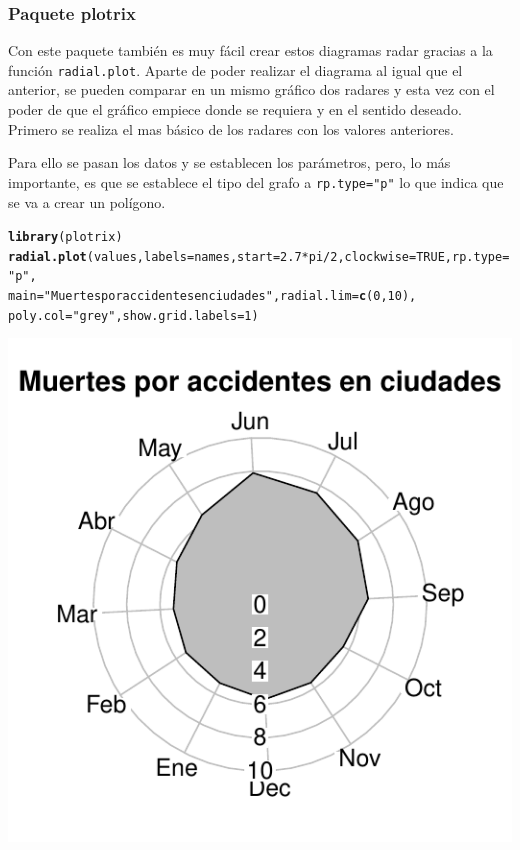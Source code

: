 \documentclass{article}\usepackage[]{graphicx}\usepackage[]{color}
\makeatletter
\def\maxwidth{ %
  \ifdim\Gin@nat@width>\linewidth
    \linewidth
  \else
    \Gin@nat@width
  \fi
}
\newcommand{\hlnum}[1]{\textcolor[rgb]{0.686,0.059,0.569}{#1}}%
\newcommand{\hlstr}[1]{\textcolor[rgb]{0.192,0.494,0.8}{#1}}%
\newcommand{\hlopt}[1]{\textcolor[rgb]{0,0,0}{#1}}%
\newcommand{\hlstd}[1]{\textcolor[rgb]{0.345,0.345,0.345}{#1}}%
\newcommand{\hlkwc}[1]{\textcolor[rgb]{0.333,0.667,0.333}{#1}}%
\newcommand{\hlkwd}[1]{\textcolor[rgb]{0.737,0.353,0.396}{\textbf{#1}}}%
\newenvironment{kframe}{%
 \def\at@end@of@kframe{}%
 \ifinner\ifhmode%
  \def\at@end@of@kframe{\end{minipage}}%
  \begin{minipage}{\columnwidth}%
 \fi\fi%
 \def\FrameCommand##1{\hskip\@totalleftmargin \hskip-\fboxsep
 \colorbox{shadecolor}{##1}\hskip-\fboxsep
     \hskip-\linewidth \hskip-\@totalleftmargin \hskip\columnwidth}%
 \MakeFramed {\advance\hsize-\width
   \@totalleftmargin\z@ \linewidth\hsize
   \@setminipage}}%
 {\par\unskip\endMakeFramed%
 \at@end@of@kframe}
\newenvironment{knitrout}{}{} %
\makeatother
\begin{document}
\subsubsection{Paquete plotrix}
Con este paquete\cite{docu_plotrix} tambi\'en es muy f\'acil crear estos diagramas radar gracias a la funci\'on \texttt{radial.plot}. Aparte de poder realizar el diagrama al igual que el anterior, se pueden comparar en un mismo gr\'afico dos radares y esta vez con el poder de que el gr\'afico empiece donde se requiera y en el sentido deseado.~\\
Primero se realiza el mas b\'asico de los radares con los valores anteriores.


Para ello se pasan los datos y se establecen los par\'ametros, pero, lo m\'as importante, es que se establece el tipo del grafo a \texttt{rp.type="p"} lo que indica que se va a crear un pol\'igono.
\begin{knitrout}
\color{fgcolor}\begin{kframe}
\begin{alltt}
\hlkwd{library}\hlstd{(plotrix)}
\hlkwd{radial.plot}\hlstd{(values,}\hlkwc{labels}\hlstd{=names,} \hlkwc{start} \hlstd{=} \hlnum{2.7}\hlopt{*}\hlstd{pi}\hlopt{/}\hlnum{2}\hlstd{,} \hlkwc{clockwise} \hlstd{=} \hlnum{TRUE}\hlstd{,}\hlkwc{rp.type}\hlstd{=}\hlstr{"p"}\hlstd{,}
            \hlkwc{main}\hlstd{=}\hlstr{"Muertes por accidentes en ciudades"}\hlstd{,}\hlkwc{radial.lim}\hlstd{=}\hlkwd{c}\hlstd{(}\hlnum{0}\hlstd{,}\hlnum{10}\hlstd{),}
            \hlkwc{poly.col}\hlstd{=}\hlstr{"grey"}\hlstd{,}\hlkwc{show.grid.labels}\hlstd{=}\hlnum{1}\hlstd{)}
\end{alltt}
\end{kframe}

{\centering \includegraphics[width=\maxwidth]{figure/plot_plotrix_1-1} 

}



\end{knitrout}
\end{document}
